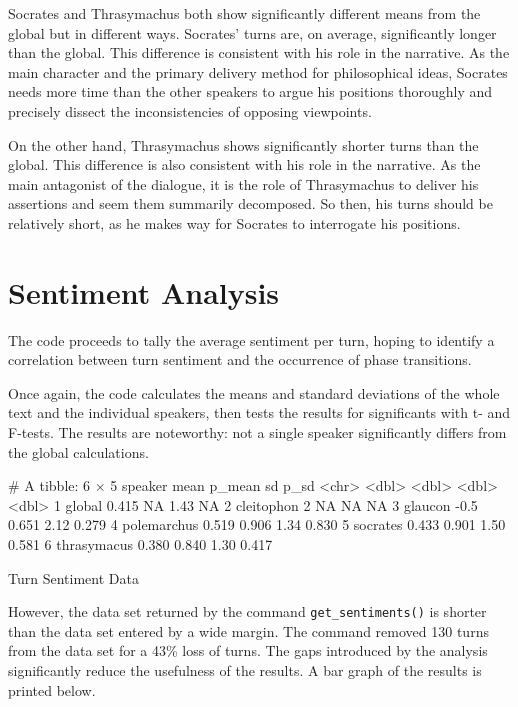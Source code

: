 \documentclass[noraggedright]{turabian-researchpaper}
\begin{document}
\noindent Socrates and Thrasymachus both show significantly different means from the global but in different ways. Socrates' turns are, on average, significantly longer than the global. This difference is consistent with his role in the narrative. As the main character and the primary delivery method for philosophical ideas, Socrates needs more time than the other speakers to argue his positions thoroughly and precisely dissect the inconsistencies of opposing viewpoints. 

On the other hand, Thrasymachus shows significantly shorter turns than the global. This difference is also consistent with his role in the narrative. As the main antagonist of the dialogue, it is the role of Thrasymachus to deliver his assertions and seem them summarily decomposed. So then, his turns should be relatively short, as he makes way for Socrates to interrogate his positions.

\section{Sentiment Analysis}

The code proceeds to tally the average sentiment per turn, hoping to identify a correlation between turn sentiment and the occurrence of phase transitions. 

Once again, the code calculates the means and standard deviations of the whole text and the individual speakers, then tests the results for significants with t- and F-tests. The results are noteworthy: not a single speaker significantly differs from the global calculations. 

\begin{table}[hbtp]
\begin{Schunk}
\begin{Soutput}
# A tibble: 6 × 5
  speaker       mean p_mean    sd   p_sd
  <chr>        <dbl>  <dbl> <dbl>  <dbl>
1 global       0.415 NA      1.43 NA    
2 cleitophon   2     NA     NA    NA    
3 glaucon     -0.5    0.651  2.12  0.279
4 polemarchus  0.519  0.906  1.34  0.830
5 socrates     0.433  0.901  1.50  0.581
6 thrasymacus  0.380  0.840  1.30  0.417
\end{Soutput}
\end{Schunk}
\caption{Turn Sentiment Data}
\label{tab:SentimentData}
\end{table}

However, the data set returned by the command \texttt{get\_sentiments()} is shorter than the data set entered by a wide margin. The command removed 130 turns from the data set for a 43\% loss of turns. The gaps introduced by the analysis significantly reduce the usefulness of the results. A bar graph of the results is printed below.
\end{document}
